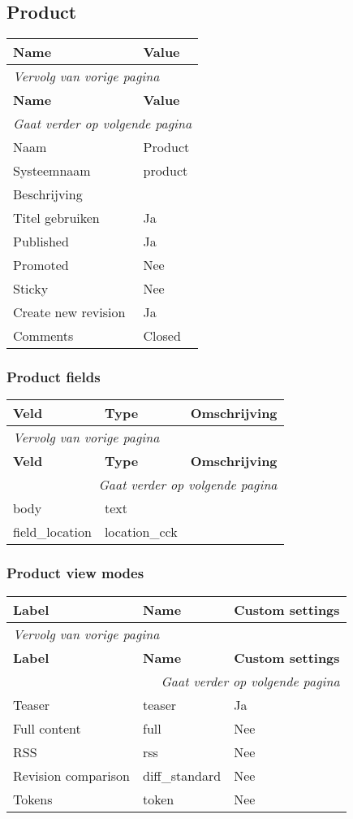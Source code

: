 \subsection{Product}
\label{sec:content-product}
  \begin{longtable}{| p{7.50cm}|p{7.50cm}|}
  \hline
  \rowcolor{tableheader}
  \textbf{Name} & \textbf{Value}  \tabularnewline
  \hline
\endfirsthead
\multicolumn{2}{l}{\textit{Vervolg van vorige pagina}} \\
\hline
\rowcolor{tableheader}
  \textbf{Name} & \textbf{Value}  \tabularnewline
  \hline
\hline
\endhead
\multicolumn{2}{r}{\textit{Gaat verder op volgende pagina}} \\
\endfoot
\hline
\endlastfoot
  Naam & Product  \tabularnewline
  \hline
  Systeemnaam & product  \tabularnewline
  \hline
  Beschrijving &   \tabularnewline
  \hline
  Titel gebruiken & Ja  \tabularnewline
  \hline
  Published & Ja  \tabularnewline
  \hline
  Promoted & Nee  \tabularnewline
  \hline
  Sticky & Nee  \tabularnewline
  \hline
  Create new revision & Ja  \tabularnewline
  \hline
  Comments & Closed  \tabularnewline
  \hline
  \end{longtable}

\subsubsection{Product fields}
  \begin{longtable}{| p{5.00cm}|p{5.00cm}|p{5.00cm}|}
  \hline
  \rowcolor{tableheader}
  \textbf{Veld} & \textbf{Type} & \textbf{Omschrijving}  \tabularnewline
  \hline
\endfirsthead
\multicolumn{3}{l}{\textit{Vervolg van vorige pagina}} \\
\hline
\rowcolor{tableheader}
  \textbf{Veld} & \textbf{Type} & \textbf{Omschrijving}  \tabularnewline
  \hline
\hline
\endhead
\multicolumn{3}{r}{\textit{Gaat verder op volgende pagina}} \\
\endfoot
\hline
\endlastfoot
  body & text &   \tabularnewline
  \hline
  field\_location & location\_cck &   \tabularnewline
  \hline
  \end{longtable}

\subsubsection{Product view modes}
  \begin{longtable}{| p{5.00cm}|p{5.00cm}|p{5.00cm}|}
  \hline
  \rowcolor{tableheader}
  \textbf{Label} & \textbf{Name} & \textbf{Custom settings}  \tabularnewline
  \hline
\endfirsthead
\multicolumn{3}{l}{\textit{Vervolg van vorige pagina}} \\
\hline
\rowcolor{tableheader}
  \textbf{Label} & \textbf{Name} & \textbf{Custom settings}  \tabularnewline
  \hline
\hline
\endhead
\multicolumn{3}{r}{\textit{Gaat verder op volgende pagina}} \\
\endfoot
\hline
\endlastfoot
  Teaser & teaser & Ja  \tabularnewline
  \hline
  Full content & full & Nee  \tabularnewline
  \hline
  RSS & rss & Nee  \tabularnewline
  \hline
  Revision comparison & diff\_standard & Nee  \tabularnewline
  \hline
  Tokens & token & Nee  \tabularnewline
  \hline
  \end{longtable}

